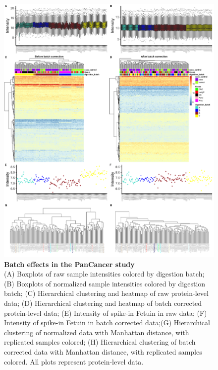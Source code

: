 \documentclass[num-refs]{wiley-article}
\begin{document}
\begin{figure}
	\includegraphics[width=\textwidth]{figures/Supp_Fig2_PanCancer.png}
	
	\caption{\textbf{Batch effects in the PanCancer study} \\
		\footnotesize (A) Boxplots of raw sample intensities colored by digestion batch; (B) Boxplots of normalized sample intensities colored by digestion batch; 
		 (C) Hierarchical clustering and heatmap of raw protein-level data; (D) Hierarchical clustering and heatmap of batch corrected protein-level data; (E) Intensity of spike-in Fetuin in raw data; (F) Intensity of spike-in Fetuin in batch corrected data;(G) Hierarchical clustering of normalized data with Manhattan distance, with replicated samples colored; (H) Hierarchical clustering of batch corrected data with Manhattan distance, with replicated samples colored. All plots represent protein-level data.}
	\label{fig:batch_figS2_PanCancer}
\end{figure}
\end{document}
